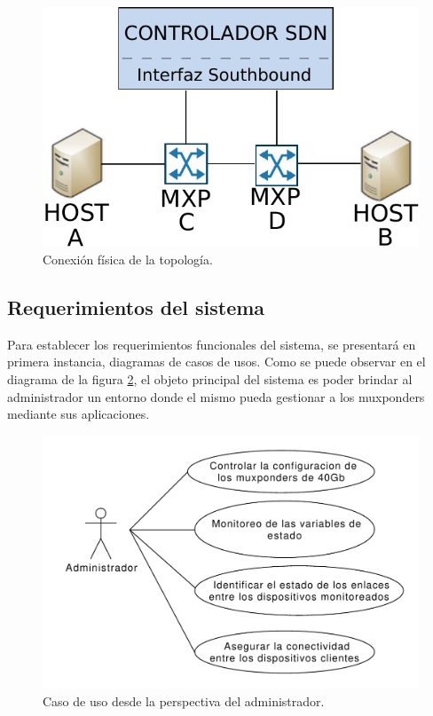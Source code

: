 \begin{figure}[H]
    \centering
    \includegraphics[scale=0.7]{Figures/topologia.pdf}
    \caption{Conexión física de la topología.}
    \label{fig:topologiafis}
  \end{figure}

\subsection{Requerimientos del sistema}

Para establecer los requerimientos funcionales del sistema, se presentará en primera instancia, diagramas de casos de usos. Como se puede observar en el diagrama de la figura \ref{fig:caso_uso_admin}, el objeto principal del sistema es poder brindar al administrador un entorno donde el mismo pueda gestionar a los muxponders mediante sus aplicaciones.

\begin{figure}[H]
    \centering
    \includegraphics[scale=0.55]{Figures/caso_uso_admin.pdf}
    \caption{Caso de uso desde la perspectiva del administrador.}
    \label{fig:caso_uso_admin}
  \end{figure}

